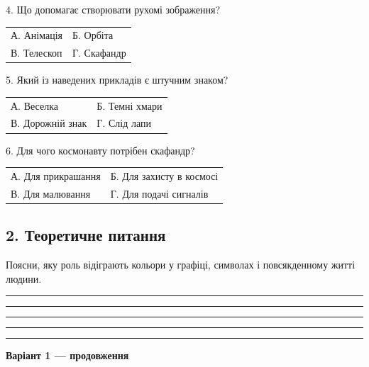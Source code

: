 \documentclass[11pt,a4paper]{article}
\begin{document}
\begin{minipage}{\linewidth}4. Що допомагає створювати рухомі зображення?\par\begin{tabularx}{\linewidth}{@{}XX@{}}А. Анімація & Б. Орбіта\\ В. Телескоп & Г. Скафандр\end{tabularx}\end{minipage}\par

\begin{minipage}{\linewidth}5. Який із наведених прикладів є штучним знаком?\par\begin{tabularx}{\linewidth}{@{}XX@{}}А. Веселка & Б. Темні хмари\\ В. Дорожній знак & Г. Слід лапи\end{tabularx}\end{minipage}\par

\begin{minipage}{\linewidth}6. Для чого космонавту потрібен скафандр?\par\begin{tabularx}{\linewidth}{@{}XX@{}}А. Для прикрашання & Б. Для захисту в космосі\\ В. Для малювання & Г. Для подачі сигналів\end{tabularx}\end{minipage}\par

\subsection*{2. Теоретичне питання}

Поясни, яку роль відіграють кольори у графіці, символах і повсякденному житті людини.\par

\rule{0.96\linewidth}{0.4pt}\par

\rule{0.96\linewidth}{0.4pt}\par

\rule{0.96\linewidth}{0.4pt}\par

\rule{0.96\linewidth}{0.4pt}\par

\rule{0.96\linewidth}{0.4pt}\par

\newpage\textbf{Варіант 1 — продовження}\par
\end{document}
